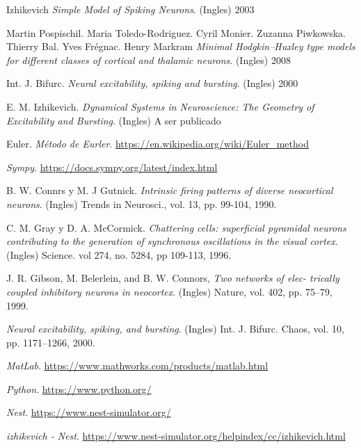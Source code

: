 \documentclass[12pt]{article}
\begin{document}
\begin{thebibliography}{9}

Izhikevich
\textit{Simple Model of Spiking Neurons}. (Ingles) 2003

Martin Pospischil. Maria Toledo-Rodriguez. Cyril Monier. Zuzanna Piwkowska. Thierry Bal. Yves Frégnac. Henry Markram
\textit{Minimal Hodgkin–Huxley type models for different classes of cortical and thalamic neurons}. (Ingles) 2008

Int. J. Bifurc.
\textit{Neural excitability, spiking and bursting}. (Ingles) 2000

E. M. Izhikevich.
\textit{Dynamical Systems in Neuroscience: The Geometry of Excitability and Bursting}. (Ingles) A ser publicado

Euler.
\textit{Método de Eurler}. \url{https://en.wikipedia.org/wiki/Euler_method}

\textit{Sympy}. \url{https://docs.sympy.org/latest/index.html}

B. W. Connrs y M. J Gutnick.
\textit{Intrinsic firing patterns of diverse neocortical neurons}. (Ingles) Trends in Neurosci., vol. 13, pp. 99-104, 1990.

C. M. Gray y D. A. McCormick.
\textit{Chattering cells: superficial pyramidal neurons contributing to the generation of synchronous oscillations in the visual cortex}. (Ingles) Science. vol 274, no. 5284, pp 109-113, 1996.

J. R. Gibson, M. Belerlein, and B. W. Connors,
\textit{Two networks of elec- trically coupled inhibitory neurons in neocortex}. (Ingles) Nature, vol. 402, pp. 75–79, 1999.

\textit{Neural excitability, spiking, and bursting}. (Ingles) Int. J. Bifurc. Chaos, vol. 10, pp. 1171–1266, 2000.

\textit{MatLab}. \url{https://www.mathworks.com/products/matlab.html}

\textit{Python}. \url{https://www.python.org/}

\textit{Nest}. \url{https://www.nest-simulator.org/}

\textit{izhikevich - Nest}. \url{https://www.nest-simulator.org/helpindex/cc/izhikevich.html}

\end{thebibliography}
\end{document}
